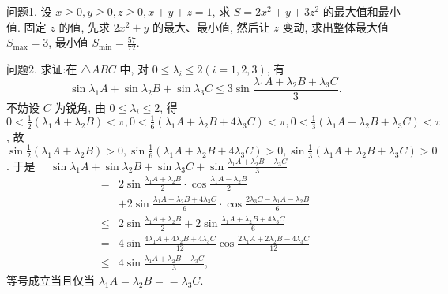 
问题1. 设 $x \geqslant 0, y \geqslant 0, z \geqslant 0, x+y+z=1$, 求 $S=2 x^2+y+3 z^2$ 的最大值和最小值.
固定 $z$ 的值, 先求 $2 x^2+y$ 的最大、最小值, 然后让 $z$ 变动, 求出整体最大值 $S_{\max }=3$, 最小值 $S_{\min }=\frac{57}{72}$.



问题2. 求证:在 $\triangle A B C$ 中, 对 $0 \leqslant \lambda_i \leqslant 2(i=1,2,3)$, 有
$$
\sin \lambda_1 A+\sin \lambda_2 B+\sin \lambda_3 C \leqslant 3 \sin \frac{\lambda_1 A+\lambda_2 B+\lambda_3 C}{3} .
$$
不妨设 $C$ 为锐角, 由 $0 \leqslant \lambda_i \leqslant 2$, 得 $0<\frac{1}{2}\left(\lambda_1 A+\lambda_2 B\right)<\pi, 0< \frac{1}{6}\left(\lambda_1 A+\lambda_2 B+4 \lambda_3 C\right)<\pi, 0<\frac{1}{3}\left(\lambda_1 A+\lambda_2 B+\lambda_3 C\right)<\pi$, 故 $\sin \frac{1}{2}\left(\lambda_1 A+\right. \left.\lambda_2 B\right)>0, \sin \frac{1}{6}\left(\lambda_1 A+\lambda_2 B+4 \lambda_3 C\right)>0, \sin \frac{1}{3}\left(\lambda_1 A+\lambda_2 B+\lambda_3 C\right)>0$.
于是 $\quad \sin \lambda_1 A+\sin \lambda_2 B+\sin \lambda_3 C+\sin \frac{\lambda_1 A+\lambda_2 B+\lambda_3 C}{3}$
$$
\begin{aligned}
= & 2 \sin \frac{\lambda_1 A+\lambda_2 B}{2} \cdot \cos \frac{\lambda_1 A-\lambda_2 B}{2} \\
& +2 \sin \frac{\lambda_1 A+\lambda_2 B+4 \lambda_3 C}{6} \cdot \cos \frac{2 \lambda_3 C-\lambda_1 A-\lambda_2 B}{6} \\
\leqslant & 2 \sin \frac{\lambda_1 A+\lambda_2 B}{2}+2 \sin \frac{\lambda_1 A+\lambda_2 B+4 \lambda_3 C}{6} \\
= & 4 \sin \frac{4 \lambda_1 A+4 \lambda_2 B+4 \lambda_3 C}{12} \cos \frac{2 \lambda_1 A+2 \lambda_2 B-4 \lambda_3 C}{12} \\
\leqslant & 4 \sin \frac{\lambda_1 A+\lambda_2 B+\lambda_3 C}{3},
\end{aligned}
$$
等号成立当且仅当 $\lambda_1 A=\lambda_2 B==\lambda_3 C$.



